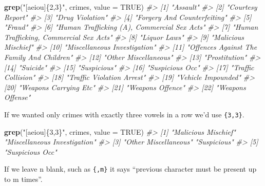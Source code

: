 \documentclass[
  12pt,
]{book}
\newenvironment{Shaded}{\begin{snugshade}}{\end{snugshade}}
\newcommand{\CommentTok}[1]{\textcolor[rgb]{0.56,0.35,0.01}{\textit{#1}}}
\newcommand{\DataTypeTok}[1]{\textcolor[rgb]{0.13,0.29,0.53}{#1}}
\newcommand{\KeywordTok}[1]{\textcolor[rgb]{0.13,0.29,0.53}{\textbf{#1}}}
\newcommand{\NormalTok}[1]{#1}
\newcommand{\OtherTok}[1]{\textcolor[rgb]{0.56,0.35,0.01}{#1}}
\newcommand{\StringTok}[1]{\textcolor[rgb]{0.31,0.60,0.02}{#1}}
\begin{document}
\begin{Shaded}
\begin{Highlighting}[]
\KeywordTok{grep}\NormalTok{(}\StringTok{"[aeiou]\{2,3\}"}\NormalTok{, crimes, }\DataTypeTok{value =} \OtherTok{TRUE}\NormalTok{)}
\CommentTok{\#>  [1] "Assault"                                   }
\CommentTok{\#>  [2] "Courtesy Report"                           }
\CommentTok{\#>  [3] "Drug Violation"                            }
\CommentTok{\#>  [4] "Forgery And Counterfeiting"                }
\CommentTok{\#>  [5] "Fraud"                                     }
\CommentTok{\#>  [6] "Human Trafficking (A), Commercial Sex Acts"}
\CommentTok{\#>  [7] "Human Trafficking, Commercial Sex Acts"    }
\CommentTok{\#>  [8] "Liquor Laws"                               }
\CommentTok{\#>  [9] "Malicious Mischief"                        }
\CommentTok{\#> [10] "Miscellaneous Investigation"               }
\CommentTok{\#> [11] "Offences Against The Family And Children"  }
\CommentTok{\#> [12] "Other Miscellaneous"                       }
\CommentTok{\#> [13] "Prostitution"                              }
\CommentTok{\#> [14] "Suicide"                                   }
\CommentTok{\#> [15] "Suspicious"                                }
\CommentTok{\#> [16] "Suspicious Occ"                            }
\CommentTok{\#> [17] "Traffic Collision"                         }
\CommentTok{\#> [18] "Traffic Violation Arrest"                  }
\CommentTok{\#> [19] "Vehicle Impounded"                         }
\CommentTok{\#> [20] "Weapons Carrying Etc"                      }
\CommentTok{\#> [21] "Weapons Offence"                           }
\CommentTok{\#> [22] "Weapons Offense"}
\end{Highlighting}
\end{Shaded}

If we wanted only crimes with exactly three vowels in a row we'd use \texttt{\{3,3\}}.

\begin{Shaded}
\begin{Highlighting}[]
\KeywordTok{grep}\NormalTok{(}\StringTok{"[aeiou]\{3,3\}"}\NormalTok{, crimes, }\DataTypeTok{value =} \OtherTok{TRUE}\NormalTok{)}
\CommentTok{\#> [1] "Malicious Mischief"          "Miscellaneous Investigation"}
\CommentTok{\#> [3] "Other Miscellaneous"         "Suspicious"                 }
\CommentTok{\#> [5] "Suspicious Occ"}
\end{Highlighting}
\end{Shaded}

If we leave n blank, such as \texttt{\{,m\}} it says ``previous character must be present up to m times''.
\end{document}
